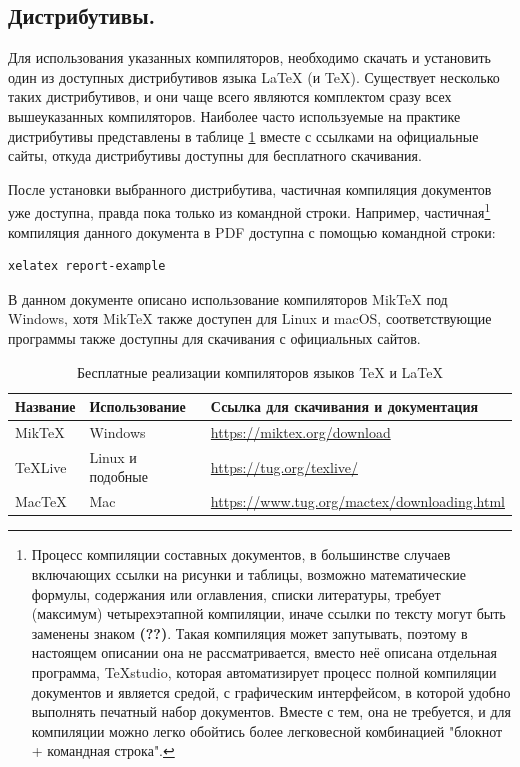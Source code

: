 \documentclass[report, draught]{fefudoc}
\begin{document}
\subsection{Дистрибутивы.}\label{раздел про дистрибутивы}
Для использования указанных компиляторов, необходимо скачать и установить один из доступных дистрибутивов языка \LaTeX{} (и \TeX{}).
Существует несколько таких дистрибутивов, и они чаще всего являются комплектом сразу всех вышеуказанных компиляторов.
Наиболее часто используемые на практике дистрибутивы представлены в таблице \ref{таблица дистрибутивов} вместе с ссылками на официальные сайты, откуда дистрибутивы доступны для бесплатного скачивания.

После установки выбранного дистрибутива, частичная компиляция документов уже доступна, правда пока только из командной строки.
Например,
частичная\footnote{Процесс компиляции составных документов, в большинстве случаев включающих ссылки на рисунки и таблицы, возможно математические формулы, содержания или оглавления, списки литературы, требует (максимум) четырехэтапной компиляции, иначе ссылки по тексту могут быть заменены знаком \textbf{(??)}. Такая компиляция может запутывать, поэтому в настоящем описании она не рассматривается, вместо неё описана отдельная программа, TeXstudio, которая автоматизирует процесс полной компиляции документов и является средой, с графическим интерфейсом, в которой удобно выполнять печатный набор документов. Вместе с тем, она не требуется, и для компиляции можно легко обойтись более легковесной комбинацией "блокнот + командная строка".}
компиляция данного документа в PDF доступна с помощью командной строки:
\begin{lstlisting}
xelatex report-example
\end{lstlisting}

В данном документе описано использование компиляторов MikTeX под Windows, хотя MikTeX также доступен для Linux и macOS, соответствующие программы также доступны для скачивания с официальных сайтов.

\begin{table}[ht]
\centering
\caption{Бесплатные реализации компиляторов языков \TeX{} и \LaTeX{}}
\label{таблица дистрибутивов}
\begin{tabularx}{\textwidth}{|l|l|X|}
\hline
\textbf{Название} & \textbf{Использование} & \textbf{Ссылка для скачивания и документация}     \\ \hline
MikTeX            & Windows                & \url{https://miktex.org/download}                 \\ \hline
TeXLive           & Linux и подобные       & \url{https://tug.org/texlive/}                    \\ \hline
MacTeX            & Mac                    & \url{https://www.tug.org/mactex/downloading.html} \\ \hline
\end{tabularx}
\end{table}
\end{document}
